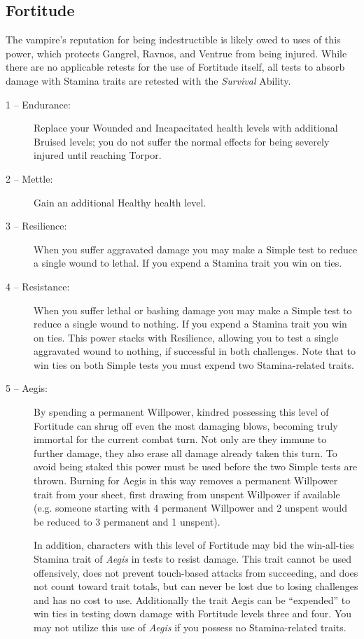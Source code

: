 \subsection{Fortitude}
The vampire's reputation for being indestructible is likely owed to uses of this power, 
which protects Gangrel, Ravnos, and Ventrue from being injured.  While there are no 
applicable retests for the use of Fortitude itself, all tests to absorb damage with Stamina 
traits are retested with the \emph{Survival} Ability.

\begin{description}
	\item[1 -- Endurance:]  Replace your Wounded and Incapacitated health levels with additional 
	Bruised levels; you do not suffer the normal effects for being severely injured until reaching 
	Torpor.
	\item[2 -- Mettle:]  Gain an additional Healthy health level.
	\item[3 -- Resilience:]  When you suffer aggravated damage you may make a Simple test to 
	reduce a single wound to lethal.  If you expend a Stamina trait you win on ties.
	\item[4 -- Resistance:]  When you suffer lethal or bashing damage you may make a Simple test 
	to reduce a single wound to nothing.  If you expend a Stamina trait you win on ties.  This 
	power stacks with Resilience, allowing you to test a single aggravated wound to nothing, if 
	successful in both challenges.  Note that to win ties on both Simple tests you must expend 
	two Stamina-related traits.
	\item[5 -- Aegis:]  By spending a permanent Willpower, kindred possessing this level of Fortitude 
	can shrug off even the most damaging blows, becoming truly immortal for the current combat turn.  
	Not only are they immune to further damage, they also erase all damage already taken this turn.  
	To avoid being staked this power must be used before the two Simple tests are thrown.  
	Burning for Aegis in this way removes a permanent Willpower trait from your sheet, first drawing 
	from unspent Willpower if available (e.g. someone starting with 4 permanent Willpower and 2 
	unspent would be reduced to 3 permanent and 1 unspent).
	
	In addition, characters with this level of Fortitude may bid the win-all-ties Stamina trait of 
	\emph{Aegis} in tests to resist damage.  This trait cannot be used offensively, does not prevent 
	touch-based attacks from succeeding, and does not count toward trait totals, but can never be 
	lost due to losing challenges and has no cost to use.  Additionally the trait Aegis can be 
	``expended'' to win ties in testing down damage with Fortitude levels three and four.  
	You may not utilize this use of \emph{Aegis} if you possess no Stamina-related traits.
\end{description}


